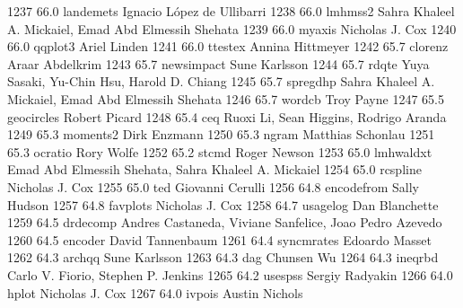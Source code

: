   1237     66.0    landemets     Ignacio López de Ullibarri             
  1238     66.0    lmhmss2       Sahra Khaleel A. Mickaiel, Emad Abd     
                                   Elmessih Shehata                        
  1239     66.0    myaxis        Nicholas J. Cox                         
  1240     66.0    qqplot3       Ariel Linden                            
  1241     66.0    ttestex       Annina Hittmeyer                        
  1242     65.7    clorenz       Araar Abdelkrim                         
  1243     65.7    newsimpact    Sune Karlsson                           
  1244     65.7    rdqte         Yuya Sasaki, Yu-Chin Hsu, Harold D.     
                                   Chiang                                  
  1245     65.7    spregdhp      Sahra Khaleel A. Mickaiel, Emad Abd     
                                   Elmessih Shehata                        
  1246     65.7    wordcb        Troy Payne                              
  1247     65.5    geocircles    Robert Picard                           
  1248     65.4    ceq           Ruoxi Li, Sean Higgins, Rodrigo Aranda  
  1249     65.3    moments2      Dirk Enzmann                            
  1250     65.3    ngram         Matthias Schonlau                       
  1251     65.3    ocratio       Rory Wolfe                              
  1252     65.2    stcmd         Roger Newson                            
  1253     65.0    lmhwaldxt     Emad Abd Elmessih Shehata, Sahra        
                                   Khaleel A. Mickaiel                     
  1254     65.0    rcspline      Nicholas J. Cox                         
  1255     65.0    ted           Giovanni Cerulli                        
  1256     64.8    encodefrom    Sally Hudson                            
  1257     64.8    favplots      Nicholas J. Cox                         
  1258     64.7    usagelog      Dan Blanchette                          
  1259     64.5    drdecomp      Andres Castaneda, Viviane Sanfelice,    
                                   Joao Pedro Azevedo                      
  1260     64.5    encoder       David Tannenbaum                        
  1261     64.4    syncmrates    Edoardo Masset                          
  1262     64.3    archqq        Sune Karlsson                           
  1263     64.3    dag           Chunsen Wu                              
  1264     64.3    ineqrbd       Carlo V. Fiorio, Stephen P. Jenkins     
  1265     64.2    usespss       Sergiy Radyakin                         
  1266     64.0    hplot         Nicholas J. Cox                         
  1267     64.0    ivpois        Austin Nichols                          
